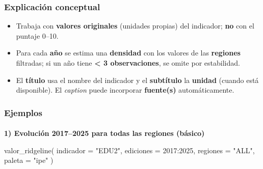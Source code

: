 \documentclass[
  11pt,
  letterpaper,
  DIV=11,
  numbers=noendperiod]{scrartcl}
\makeatletter
\let\oldparagraph\paragraph
\renewcommand{\paragraph}{
    \@ifstar
      \xxxParagraphStar
      \xxxParagraphNoStar
  }
\newcommand{\xxxParagraphStar}[1]{\oldparagraph*{#1}\mbox{}}
\newcommand{\xxxParagraphNoStar}[1]{\oldparagraph{#1}\mbox{}}
\newenvironment{Shaded}{\begin{snugshade}}{\end{snugshade}}
\newcommand{\AttributeTok}[1]{\textcolor[rgb]{0.40,0.45,0.13}{#1}}
\newcommand{\DecValTok}[1]{\textcolor[rgb]{0.68,0.00,0.00}{#1}}
\newcommand{\FunctionTok}[1]{\textcolor[rgb]{0.28,0.35,0.67}{#1}}
\newcommand{\NormalTok}[1]{\textcolor[rgb]{0.00,0.23,0.31}{#1}}
\newcommand{\SpecialCharTok}[1]{\textcolor[rgb]{0.37,0.37,0.37}{#1}}
\newcommand{\StringTok}[1]{\textcolor[rgb]{0.13,0.47,0.30}{#1}}
\makeatother
\begin{document}
\subsubsection{\texorpdfstring{\textbf{Explicación
conceptual}}{Explicación conceptual}}\label{explicaciuxf3n-conceptual-19}

\begin{itemize}
\item
  Trabaja con \textbf{valores originales} (unidades propias) del
  indicador; \textbf{no} con el puntaje 0--10.
\item
  Para cada \textbf{año} se estima una \textbf{densidad} con los valores
  de las \textbf{regiones} filtradas; si un año tiene
  \textbf{\textless{} 3 observaciones}, se omite por estabilidad.
\item
  El \textbf{título} usa el nombre del indicador y el \textbf{subtítulo}
  la \textbf{unidad} (cuando está disponible). El \emph{caption} puede
  incorporar \textbf{fuente(s)} automáticamente.
\end{itemize}

\subsubsection{\texorpdfstring{\textbf{Ejemplos}}{Ejemplos}}\label{ejemplos-19}

\paragraph{\texorpdfstring{\textbf{1) Evolución 2017--2025 para todas
las regiones
(básico)}}{1) Evolución 2017--2025 para todas las regiones (básico)}}\label{evoluciuxf3n-20172025-para-todas-las-regiones-buxe1sico}

\begin{Shaded}
\begin{Highlighting}[]
\FunctionTok{valor\_ridgeline}\NormalTok{(}
  \AttributeTok{indicador =} \StringTok{"EDU2"}\NormalTok{,}
  \AttributeTok{ediciones =} \DecValTok{2017}\SpecialCharTok{:}\DecValTok{2025}\NormalTok{,}
  \AttributeTok{regiones  =} \StringTok{"ALL"}\NormalTok{,}
  \AttributeTok{paleta    =} \StringTok{"ipe"}
\NormalTok{)}
\end{Highlighting}
\end{Shaded}
\end{document}
